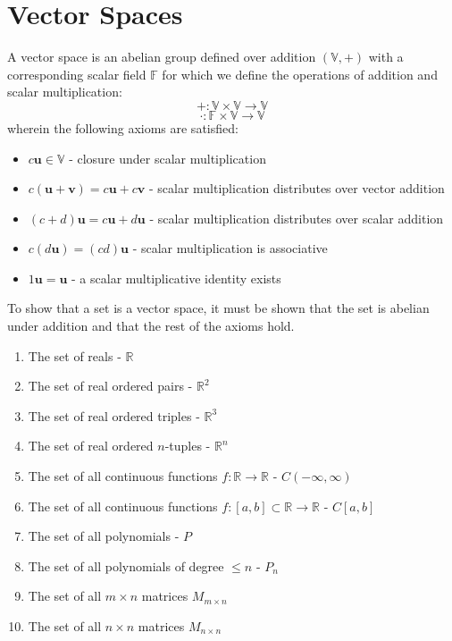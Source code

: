 \section{Vector Spaces}
\begin{definition}
    A vector space is an abelian group defined over addition \(\left( \mathbb{V} ,+ \right) \) with a corresponding scalar field \(\mathbb{F} \) for which we define the operations of addition and scalar multiplication: 
    \[
        +:\mathbb{V} \times \mathbb{V} \to \mathbb{V} 
    \]
    \[
        \cdot :\mathbb{F} \times \mathbb{V} \to \mathbb{V} 
    \]
    wherein the following axioms are satisfied: 
    \begin{itemize}
        \item \(c \mathbf{u} \in\mathbb{V} \) - closure under scalar multiplication
        \item \(c(\mathbf{u} +\mathbf{v} )=c \mathbf{u} +c \mathbf{v} \) - scalar multiplication distributes over vector addition
        \item \((c+d)\mathbf{u} =c \mathbf{u} +d \mathbf{u} \) - scalar multiplication distributes over scalar addition 
        \item \(c(d \mathbf{u} )=(cd)\mathbf{u} \) - scalar multiplication is associative
        \item \(1 \mathbf{u} = \mathbf{u} \) - a scalar multiplicative identity exists
    \end{itemize}
\end{definition}
To show that a set is a vector space, it must be shown that the set is abelian under addition and that the rest of the axioms hold.
\begin{remark}
    \begin{enumerate}
        \item The set of reals - \(\mathbb{R} \)
        \item The set of real ordered pairs - \(\mathbb{R} ^2\)
        \item The set of real ordered triples - \(\mathbb{R} ^3\)
        \item The set of real ordered \(n\)-tuples - \(\mathbb{R} ^n\)
        \item The set of all continuous functions \(f:\mathbb{R}\to \mathbb{R}  \) - \(C(-\infty,\infty)\)
        \item The set of all continuous functions \(f:[a,b]\subset\mathbb{R}\to \mathbb{R}  \) - \(C[a,b]\)
        \item The set of all polynomials - \(P\)
        \item The set of all polynomials of degree \(\leq n\) - \(P_n\)
        \item The set of all \(m\times n\) matrices \(M_{m\times n} \)
        \item The set of all \(n\times n\) matrices \(M_{n\times n} \)
    \end{enumerate}
\end{remark}

